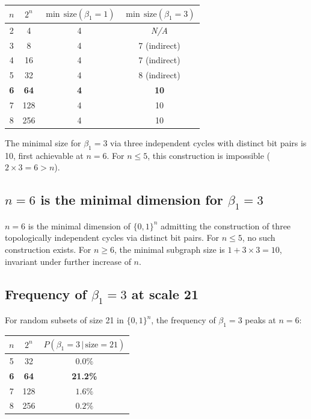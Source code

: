 \documentclass[11pt,a4paper]{article}
\begin{document}
\begin{result_box}[title={Script 4 --- Dimensional scan}]
\begin{center}
\begin{tabular}{cccc}
\toprule
$n$ & $2^n$ & $\min\,\mathrm{size}(\beta_1=1)$ & $\min\,\mathrm{size}(\beta_1=3)$ \\
\midrule
2 & 4   & 4 & \emph{N/A} \\
3 & 8   & 4 & 7 (indirect) \\
4 & 16  & 4 & 7 (indirect) \\
5 & 32  & 4 & 8 (indirect) \\
\textbf{6} & \textbf{64}  & \textbf{4} & \textbf{10} \\
7 & 128 & 4 & 10 \\
8 & 256 & 4 & 10 \\
\bottomrule
\end{tabular}
\end{center}
The minimal size for $\beta_1 = 3$ via three independent cycles with distinct bit pairs is 10, first achievable at $n = 6$. For $n \leq 5$, this construction is impossible ($2 \times 3 = 6 > n$).
\end{result_box}

\subsection{\texorpdfstring{$n = 6$ is the minimal dimension for $\beta_1 = 3$}{n = 6 is the minimal dimension for beta1 = 3}}

\begin{theorem_box}
$n = 6$ is the minimal dimension of $\{0,1\}^n$ admitting the construction of three topologically independent cycles via distinct bit pairs. For $n \leq 5$, no such construction exists. For $n \geq 6$, the minimal subgraph size is $1 + 3 \times 3 = 10$, invariant under further increase of $n$.
\end{theorem_box}

\subsection{Frequency of \texorpdfstring{$\beta_1 = 3$}{b1 = 3} at scale 21}

For random subsets of size 21 in $\{0,1\}^n$, the frequency of $\beta_1 = 3$ peaks at $n = 6$:

\begin{center}
\begin{tabular}{ccc}
\toprule
$n$ & $2^n$ & $P(\beta_1 = 3\,|\,\text{size} = 21)$ \\
\midrule
5 & 32  & $0.0\%$ \\
\textbf{6} & \textbf{64}  & \textbf{21.2\%} \\
7 & 128 & $1.6\%$ \\
8 & 256 & $0.2\%$ \\
\bottomrule
\end{tabular}
\end{center}
\end{document}
